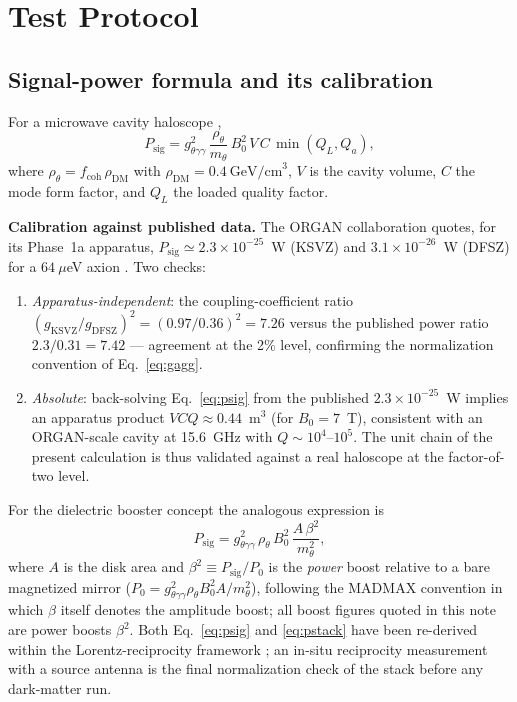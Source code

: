\documentclass[11pt,a4paper]{article}
\begin{document}
\section{Test Protocol}
\label{sec:protocol}

\subsection{Signal-power formula and its calibration}
\label{sec:calib}

For a microwave cavity haloscope \cite{Sikivie1983,Egge2023},
\begin{equation}
P_{\mathrm{sig}} = g_{\theta\gamma\gamma}^{2}\,
\frac{\rho_\theta}{m_\theta}\,B_0^{2}\,V\,C\,\min(Q_L, Q_a),
\label{eq:psig}
\end{equation}
where $\rho_\theta = f_{\mathrm{coh}}\,\rho_{\mathrm{DM}}$ with
$\rho_{\mathrm{DM}} = 0.4~\text{GeV/cm}^3$, $V$ is the cavity volume,
$C$ the mode form factor, and $Q_L$ the loaded quality factor.

\textbf{Calibration against published data.} The ORGAN collaboration quotes,
for its Phase~1a apparatus, $P_{\mathrm{sig}} \simeq 2.3\times 10^{-25}$~W
(KSVZ) and $3.1\times 10^{-26}$~W (DFSZ) for a $64~\mu$eV axion
\cite{ORGAN2022}. Two checks:
\begin{enumerate}
\item \emph{Apparatus-independent}: the coupling-coefficient ratio
$(g_{\mathrm{KSVZ}}/g_{\mathrm{DFSZ}})^2 = (0.97/0.36)^2 = 7.26$ versus the
published power ratio $2.3/0.31 = 7.42$ --- agreement at the 2\% level,
confirming the normalization convention of Eq.~\eqref{eq:gagg}.
\item \emph{Absolute}: back-solving Eq.~\eqref{eq:psig} from the published
$2.3\times 10^{-25}$~W implies an apparatus product $V C Q \approx 0.44$~m$^3$
(for $B_0 = 7$~T), consistent with an ORGAN-scale cavity at 15.6~GHz with
$Q \sim 10^{4}$--$10^{5}$. The unit chain of the present calculation is thus
validated against a real haloscope at the factor-of-two level.
\end{enumerate}

For the dielectric booster concept \cite{MADMAX2017,MADMAXtheory,MADMAX2019} the
analogous expression is
\begin{equation}
P_{\mathrm{sig}} = g_{\theta\gamma\gamma}^{2}\,\rho_\theta\,B_0^{2}\,
\frac{A\,\beta^{2}}{m_\theta^{2}},
\label{eq:pstack}
\end{equation}
where $A$ is the disk area and $\beta^{2} \equiv P_{\mathrm{sig}}/P_0$ is the
\emph{power} boost relative to a bare magnetized mirror
($P_0 = g_{\theta\gamma\gamma}^{2}\rho_\theta B_0^{2} A/m_\theta^{2}$),
following the MADMAX convention \cite{MADMAXproto} in which $\beta$ itself
denotes the amplitude boost; all boost figures quoted in this note are power
boosts $\beta^2$. Both Eq.~\eqref{eq:psig} and \eqref{eq:pstack} have been
re-derived within the Lorentz-reciprocity framework \cite{Egge2023,Egge2024exp};
an in-situ reciprocity measurement with a source antenna is the final
normalization check of the stack before any dark-matter run.
\end{document}
